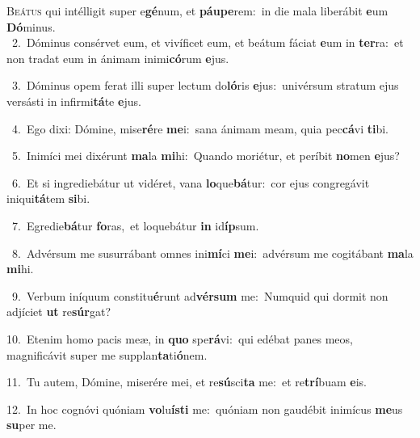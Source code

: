 \lettrine{\initial\textcolor{\initialcolor}{B}}{eátus} qui intélligit super e\-\textbf{gé}\-num, et \textbf{páu}\-\textbf{pe}rem:~\star in die mala liberábit \textbf{e}\-um \textbf{Dó}\-minus.\\
{\numbfont\textcolor{\numbcolor}{~2.}}~Dóminus consérvet eum, et vivíficet eum, et beátum fáciat \textbf{e}\-um in \textbf{ter}\-ra:~\star et non tradat eum in ánimam inimi\-\textbf{có}\-rum \textbf{e}\-jus.\par
{\numbfont\textcolor{\numbcolor}{~3.}}~Dóminus opem ferat illi super lectum do\-\textbf{ló}\-ris \textbf{e}\-jus:~\star univérsum stratum ejus versásti in infirmi\-\textbf{tá}\-te \textbf{e}\-jus.\par
{\numbfont\textcolor{\numbcolor}{~4.}}~Ego dixi: Dómine, mise\-\textbf{ré}\-re \textbf{me}\-i:~\star sana ánimam meam, quia pec\-\textbf{cá}\-vi \textbf{ti}\-bi.\par
{\numbfont\textcolor{\numbcolor}{~5.}}~Inimíci mei dixérunt \textbf{ma}\-la \textbf{mi}\-hi:~\star Quando moriétur, et períbit \textbf{no}\-men \textbf{e}\-jus?\par
{\numbfont\textcolor{\numbcolor}{~6.}}~Et si ingrediebátur ut vidéret, vana \textbf{lo}\-que\-\textbf{bá}\-tur:~\star cor ejus congregávit iniqui\-\textbf{tá}\-tem \textbf{si}\-bi.\par
{\numbfont\textcolor{\numbcolor}{~7.}}~Egredie\-\textbf{bá}\-tur \textbf{fo}\-ras,~\star et loquebátur \textbf{in} id\-\textbf{íp}\-sum.\par
{\numbfont\textcolor{\numbcolor}{~8.}}~Advérsum me susurrábant omnes ini\-\textbf{mí}\-ci \textbf{me}\-i:~\star advérsum me cogitábant \textbf{ma}\-la \textbf{mi}\-hi.\par
{\numbfont\textcolor{\numbcolor}{~9.}}~Verbum iníquum constitu\-\textbf{é}\-runt ad\-\textbf{vér}\-\textbf{sum} me:~\star Numquid qui dormit non adjíciet \textbf{ut} re\-\textbf{súr}\-gat?\par
{\numbfont\textcolor{\numbcolor}{10.}}~Etenim homo pacis meæ, in \textbf{quo} spe\-\textbf{rá}\-vi:~\star qui edébat panes meos, magnificávit super me supplan\-\textbf{ta}\-ti\-\textbf{ó}\-nem.\par
{\numbfont\textcolor{\numbcolor}{11.}}~Tu autem, Dómine, miserére mei, et re\-\textbf{sú}\-sci\textbf{ta} me:~\star et re\-\textbf{trí}\-buam \textbf{e}\-is.\par
{\numbfont\textcolor{\numbcolor}{12.}}~In hoc cognóvi quóniam \textbf{vo}\-lu\-\textbf{ís}\-\textbf{ti} me:~\star quóniam non gaudébit inimícus \textbf{me}\-us \textbf{su}\-per me.\par
